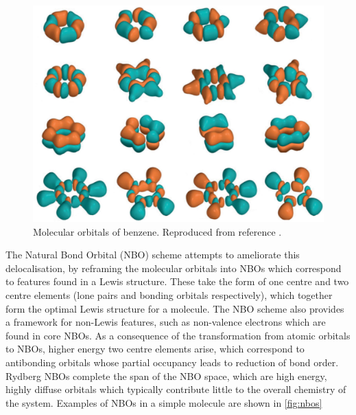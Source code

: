 \begin{refsection}
\begin{figure}
    \includegraphics[width=0.8\linewidth]{Figures/benzene-mo.pdf}
    \caption{Molecular orbitals of benzene. Reproduced from reference \cite{Luhmann2015}.}
    \label{fig:benzene-mo}
\end{figure}

The Natural Bond Orbital (NBO) scheme attempts to ameliorate this delocalisation, by reframing the molecular orbitals into NBOs which correspond to features found in a Lewis structure.\autocite{Reed1988}
These take the form of one centre and two centre elements (lone pairs and bonding orbitals respectively), which together form the optimal Lewis structure for a molecule.
The NBO scheme also provides a framework for non-Lewis features, such as non-valence electrons which are found in core NBOs.
As a consequence of the transformation from atomic orbitals to NBOs, higher energy two centre elements arise, which correspond to antibonding orbitals whose partial occupancy leads to reduction of bond order.
Rydberg NBOs complete the span of the NBO space, which are high energy, highly diffuse orbitals which typically contribute little to the overall chemistry of the system. 
Examples of NBOs in a simple molecule are shown in \cref{fig:nbos}


\end{refsection}
